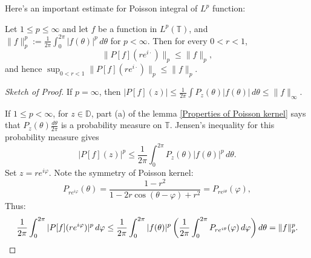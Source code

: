 Here's an important estimate for Poisson integral of $L^p$ function:
\begin{theorem}
Let $1\leq p\leq\infty$ and let $f$ be a function in $L^p(\mathbb{T})$, and
$\|f\|_p^p:=\frac{1}{2\pi}\int_0^{2\pi}|f(\theta)|^p\, d\theta$ for $p<\infty$. Then for every
$0<r<1$,
\begin{equation*}
  \|P[f](re^{i\cdot})\|_p\leq\|f\|_p,
\end{equation*}
and hence $\sup_{0<r<1}\|P[f](re^{i\cdot})\|_p\leq\|f\|_p$.
\end{theorem}
\begin{proof}[Sketch of Proof]
If $p=\infty$, then $|P[f](z)|\leq\frac{1}{2\pi}\int P_z(\theta)|f(\theta)|\, d\theta
\leq\|f\|_\infty$.

If $1\leq p<\infty$, for $z\in\mathbb{D}$, part (a) of the lemma \ref{Properties of Poisson kernel} says that $P_z(\theta)\frac{d\theta}{2\pi}$ is a
probability measure on $\mathbb{T}$. Jensen's inequality for this probability measure gives
\begin{equation*}
  |P[f](z)|^p\leq\frac{1}{2\pi}\int_0^{2\pi} P_z(\theta)|f(\theta)|^p\, d\theta.
\end{equation*}
Set $z=re^{i\varphi}$. Note the symmetry of Poisson kernel:
\begin{equation*}
  P_{re^{i\varphi}}(\theta)=\frac{1-r^2}{1-2r\cos(\theta-\varphi)+r^2}=P_{re^{i\theta}}(\varphi),
\end{equation*}
Thus:
\begin{equation*}
  \frac{1}{2\pi}\int_0^{2\pi}|P[f](re^{i\varphi})|^p\, d\varphi
  \leq\frac{1}{2\pi}\int_0^{2\pi}|f(\theta)|^p
  \left(\frac{1}{2\pi}\int_0^{2\pi}P_{re^{i\theta}}(\varphi)\, d\varphi\right) d\theta
  =\|f\|_p^p. \qedhere
\end{equation*}
\end{proof}

